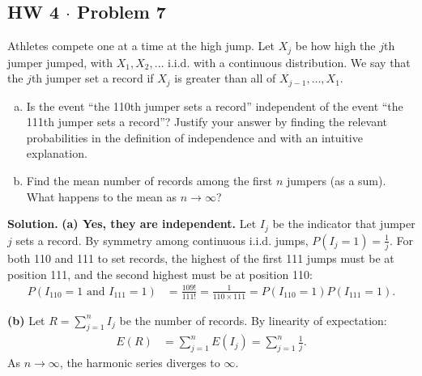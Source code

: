 \documentclass[11pt,a4paper]{article}
\begin{document}
\vspace{10pt}
\subsection{HW 4 $\cdot$ Problem 7}
\begin{tcolorbox}[title={HW 4 $\cdot$ Problem 7}]
Athletes compete one at a time at the high jump. Let $X_j$ be how high the $j$th jumper jumped, with $X_1, X_2, \dots$ i.i.d. with a continuous distribution. We say that the $j$th jumper set a record if $X_j$ is greater than all of $X_{j-1}, \dots, X_1$.
\begin{enumerate}[(a)]
\item Is the event ``the 110th jumper sets a record'' independent of the event ``the 111th jumper sets a record''? Justify your answer by finding the relevant probabilities in the definition of independence and with an intuitive explanation.
\item Find the mean number of records among the first $n$ jumpers (as a sum). What happens to the mean as $n \rightarrow \infty$?
\end{enumerate}
\end{tcolorbox}

\noindent \textbf{Solution.} \textbf{(a) Yes, they are independent.}
Let $I_j$ be the indicator that jumper $j$ sets a record. By symmetry among continuous i.i.d. jumps, $P(I_j = 1) = \frac{1}{j}$. For both 110 and 111 to set records, the highest of the first 111 jumps must be at position 111, and the second highest must be at position 110:
\begin{align*}
P(I_{110} = 1 \text{ and } I_{111} = 1) &= \frac{109!}{111!} = \frac{1}{110 \times 111} = P(I_{110} = 1) P(I_{111} = 1).
\end{align*}

\vspace{4pt}
\noindent \textbf{(b)} Let $R = \sum_{j=1}^{n} I_j$ be the number of records. By linearity of expectation:
\begin{align*}
E(R) &= \sum_{j=1}^{n} E(I_j) = \sum_{j=1}^{n} \frac{1}{j}.
\end{align*}
As $n \to \infty$, the harmonic series diverges to $\infty$.

\vspace{10pt}
\end{document}
